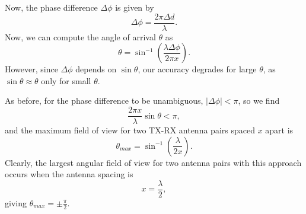 Now, the phase difference $\Delta \phi$ is given by
\begin{equation}
	\Delta \phi = \frac{2\pi \Delta d}{\lambda}.
\end{equation}
Now, we can compute the angle of arrival $\theta$ as 
\begin{equation}
	\theta = \sin^{-1}(\frac{\lambda\Delta\phi}{2\pi x}).
\end{equation}
However, since $\Delta\phi$ depends on $\sin\theta$, our accuracy degrades for
large $\theta$, as $\sin\theta \approx \theta$ only for small $\theta$. 

As before, for the phase difference to be unambiguous, $|\Delta\phi |<\pi$, so we
find
\begin{equation}
	\frac{2\pi x}{\lambda} \sin\theta < \pi,
\end{equation}
and the maximum field of view for two TX-RX antenna pairs spaced $x$ apart is 
\begin{equation}
	\theta_{max} = \sin^{-1}(\frac{\lambda}{2x}).
\end{equation}
Clearly, the largest angular field of view for two antenna pairs with this
approach occurs when the antenna spacing is
\begin{equation}
	x = \frac{\lambda}{2},
\end{equation}
giving $\theta_{max} = \pm\frac{\pi}{2}$.


